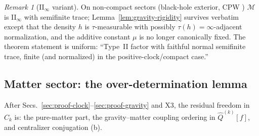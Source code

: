 \documentclass[11pt,a4paper]{article}
\theoremstyle{definition}
\theoremstyle{remark}
\newtheorem{remark}[theorem]{Remark}
\newcommand{\MM}{\mathcal{M}}
\newcommand{\tr}{\tau}
\begin{document}
\begin{remark}[II$_\infty$ variant]\label{rem:IIinfty-variant}
On non-compact sectors (black-hole exterior, CPW
\cite{CPW2022}) $\MM$ is II$_\infty$ with semifinite trace;
Lemma~\ref{lem:gravity-rigidity} survives verbatim except that
the density $h$ is $\tr$-measurable with possibly
$\tr(h)=\infty$-adjacent normalization, and the additive
constant $\mu$ is no longer canonically fixed. The theorem
statement is uniform: ``Type~II factor with faithful normal
semifinite trace, finite (and normalized) in the
positive-clock/compact case.''
\end{remark}

\subsection{Matter sector: the over-determination
lemma}\label{sec:proof-matter}

After Secs.~\ref{sec:proof-clock}--\ref{sec:proof-gravity} and
X3, the residual freedom in $\widehat C_k$ is: the pure-matter
part, the gravity--matter coupling ordering in
$\widehat Q^{(k)}[f]$, and centralizer conjugation (b).
\end{document}
